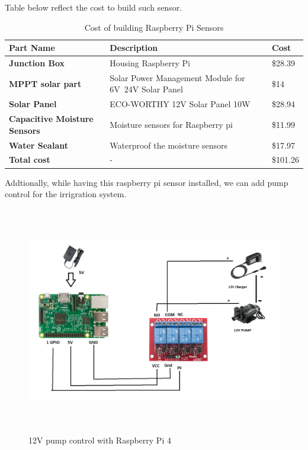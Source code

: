 \documentclass[10pt, a4paper]{article}
\begin{document}
\par Table below reflect the cost to build such sensor.
\begin{table}[!ht]
    \centering
    \begin{tabular}{|l|l|l|}
    \hline
    \textbf{Part Name} & \textbf{Description} & \textbf{Cost} \\ \hline
        \textbf{Junction Box} & Housing Raspberry Pi & \$28.39 \\ \hline
        \textbf{MPPT solar part} & Solar Power Management Module for 6V~24V Solar Panel & \$14 \\ \hline
	\textbf{Solar Panel} & ECO-WORTHY 12V Solar Panel 10W & \$28.94 \\ \hline
	\textbf{Capacitive Moisture Sensors} & Moisture sensors for Raspberry pi  & \$11.99 \\ \hline
	\textbf{Water Sealant} & Waterproof the moisture sensors & \$17.97 \\ \hline
	\textbf{Total cost} & - & \$101.26 \\ \hline 
    \end{tabular}
    \caption{Cost of building Raspberry Pi Sensors}
\end{table}

\par Addtionally, while having this raspberry pi sensor installed, we can add pump control for the irrigration system.
\begin{figure}[!ht]
  \centering
    \includegraphics[width=1\textwidth, height=10cm]{water-pump.png}
  \caption{12V pump control with Raspberry Pi 4}
\end{figure}
\end{document}
